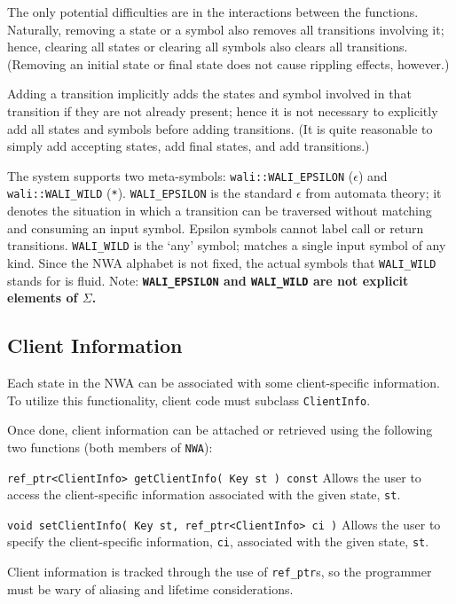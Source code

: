 The only potential difficulties are in the interactions between the
functions. Naturally, removing a state or a symbol also removes all
transitions involving it; hence, clearing all states or clearing all symbols
also clears all transitions. (Removing an initial state or final state
does not cause rippling effects, however.)

Adding a transition implicitly adds the states and symbol involved in that
transition if they are not already present; hence it is not necessary to
explicitly add all states and symbols before adding transitions. (It is quite
reasonable to simply add accepting states, add final states, and add
transitions.)


The system supports two meta-symbols: \texttt{wali::WALI\_EPSILON}
(\texttt{$\epsilon$}) and \texttt{wali::WALI\_WILD} (\texttt{*}).
\texttt{WALI\_EPSILON} is the standard $\epsilon$ from automata theory; it
denotes the situation in which a transition can be traversed without matching
and consuming an input symbol.  Epsilon symbols cannot label call or return
transitions. \texttt{WALI\_WILD} is the `any' symbol; matches a single input
symbol of any kind.  Since the NWA alphabet is not fixed, the actual symbols
that \texttt{WALI\_WILD} stands for is fluid.  Note:
\textbf{\texttt{WALI\_EPSILON} and \texttt{WALI\_WILD} are not explicit
  elements of $\Sigma$.}



\subsection{Client Information}
\label{Se:client-info}

Each state in the NWA can be associated with some client-specific
information. To utilize this functionality, client code must subclass
\texttt{ClientInfo}. 

Once done, client information can be attached or retrieved using the
following two functions (both members of \texttt{NWA}):
\begin{description}
  \item\texttt{ref\_ptr<ClientInfo> getClientInfo( Key st ) const} \nopagebreak
    Allows the user to access the client-specific information associated with
    the given state, \texttt{st}.
  \item\texttt{void setClientInfo( Key st, ref\_ptr<ClientInfo> ci )} \nopagebreak
    Allows the user to specify the client-specific information, \texttt{ci},
    associated with the given state, \texttt{st}. \\
\end{description}
Client information is tracked through the use of \texttt{ref\_ptr}s, so the
programmer must be wary of aliasing and lifetime considerations.



